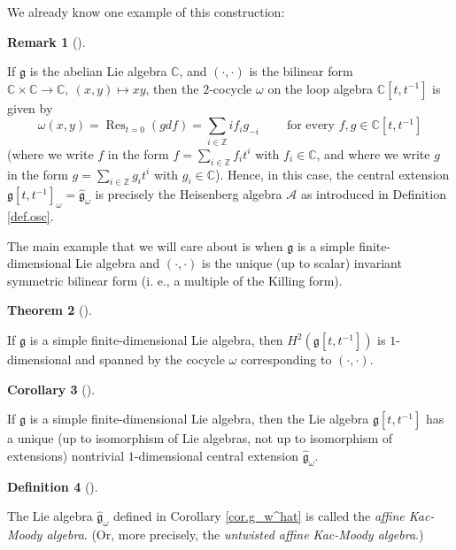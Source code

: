 \documentclass
[numbers=enddot,12pt,final,onecolumn,german,notitlepage]{scrartcl}%
\theoremstyle{definition}
\newtheorem{theo}{Theorem}
\newenvironment{theorem}[1][]
{\begin{theo}[#1]\begin{leftbar}}
{\end{leftbar}\end{theo}}
\newtheorem{defi}[theo]{Definition}
\newenvironment{definition}[1][]
{\begin{defi}[#1]\begin{leftbar}}
{\end{leftbar}\end{defi}}
\newtheorem{remk}[theo]{Remark}
\newenvironment{remark}[1][]
{\begin{remk}[#1]\begin{leftbar}}
{\end{leftbar}\end{remk}}
\newtheorem{coro}[theo]{Corollary}
\newenvironment{corollary}[1][]
{\begin{coro}[#1]\begin{leftbar}}
{\end{leftbar}\end{coro}}
\begin{document}
We already know one example of this construction:

\begin{remark}
If $\mathfrak{g}$ is the abelian Lie algebra $\mathbb{C}$, and $\left(
\cdot,\cdot\right)  $ is the bilinear form $\mathbb{C}\times\mathbb{C}%
\rightarrow\mathbb{C},\ \left(  x,y\right)  \mapsto xy$, then the $2$-cocycle
$\omega$ on the loop algebra $\mathbb{C}\left[  t,t^{-1}\right]  $ is given by%
\[
\omega\left(  x,y\right)  =\operatorname*{Res}\nolimits_{t=0}\left(
gdf\right)  =\sum\limits_{i\in\mathbb{Z}}if_{i}g_{-i}%
\ \ \ \ \ \ \ \ \ \ \text{for every }f,g\in\mathbb{C}\left[  t,t^{-1}\right]
\]
(where we write $f$ in the form $f=\sum\limits_{i\in\mathbb{Z}}f_{i}t^{i}$
with $f_{i}\in\mathbb{C}$, and where we write $g$ in the form $g=\sum
\limits_{i\in\mathbb{Z}}g_{i}t^{i}$ with $g_{i}\in\mathbb{C}$). Hence, in this
case, the central extension $\mathfrak{g}\left[  t,t^{-1}\right]  _{\omega
}=\widehat{\mathfrak{g}}_{\omega}$ is precisely the Heisenberg algebra
$\mathcal{A}$ as introduced in Definition \ref{def.osc}.
\end{remark}

The main example that we will care about is when $\mathfrak{g}$ is a simple
finite-dimensional Lie algebra and $\left(  \cdot,\cdot\right)  $ is the
unique (up to scalar) invariant symmetric bilinear form (i. e., a multiple of
the Killing form).

\begin{theorem}
\label{thm.H^2(gtt)}If $\mathfrak{g}$ is a simple finite-dimensional Lie
algebra, then $H^{2}\left(  \mathfrak{g}\left[  t,t^{-1}\right]  \right)  $ is
$1$-dimensional and spanned by the cocycle $\omega$ corresponding to $\left(
\cdot,\cdot\right)  $.
\end{theorem}

\begin{corollary}
\label{cor.g_w^hat}If $\mathfrak{g}$ is a simple finite-dimensional Lie
algebra, then the Lie algebra $\mathfrak{g}\left[  t,t^{-1}\right]  $ has a
unique (up to isomorphism of Lie algebras, not up to isomorphism of
extensions) nontrivial $1$-dimensional central extension
$\widehat{\mathfrak{g}}_{\omega}$.
\end{corollary}

\begin{definition}
\label{def.kac}The Lie algebra $\widehat{\mathfrak{g}}_{\omega}$ defined in
Corollary \ref{cor.g_w^hat} is called the \textit{affine Kac-Moody algebra}.
(Or, more precisely, the \textit{untwisted affine Kac-Moody algebra}.)
\end{definition}
\end{document}
